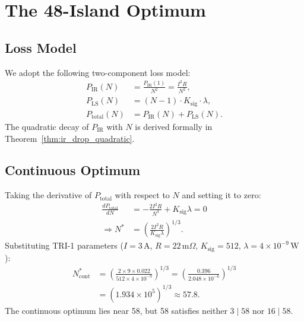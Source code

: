 \section{The 48-Island Optimum}
\label{sec:opt_48}

\subsection{Loss Model}

We adopt the following two-component loss model:
\begin{align}
  P_{\mathrm{IR}}(N) &= \frac{P_{\mathrm{IR}}(1)}{N^2}
    = \frac{I^2 R}{N^2},
    \label{eq:pir_n} \\
  P_{\mathrm{LS}}(N) &= (N-1) \cdot K_{\mathrm{sig}} \cdot \lambda,
    \label{eq:pls_n} \\
  P_{\mathrm{total}}(N) &= P_{\mathrm{IR}}(N) + P_{\mathrm{LS}}(N).
    \label{eq:ptotal_n}
\end{align}
The quadratic decay of $P_{\mathrm{IR}}$ with $N$ is derived formally in
Theorem~\ref{thm:ir_drop_quadratic}.

\subsection{Continuous Optimum}

Taking the derivative of $P_{\mathrm{total}}$ with respect to $N$ and setting
it to zero:
\begin{align}
  \frac{dP_{\mathrm{total}}}{dN}
  &= -\frac{2 I^2 R}{N^3} + K_{\mathrm{sig}} \lambda = 0 \\
  \Rightarrow N^* &= \left( \frac{2 I^2 R}{K_{\mathrm{sig}} \lambda} \right)^{1/3}.
  \label{eq:nstar_cont}
\end{align}
Substituting TRI-1 parameters ($I = 3\,\mathrm{A}$, $R = 22\,\mathrm{m}\Omega$,
$K_{\mathrm{sig}} = 512$, $\lambda = 4 \times 10^{-9}\,\mathrm{W}$):
\begin{align}
  N^*_{\mathrm{cont}}
  &= \left( \frac{2 \times 9 \times 0.022}{512 \times 4 \times 10^{-9}} \right)^{1/3}
   = \left( \frac{0.396}{2.048 \times 10^{-6}} \right)^{1/3} \\
  &= \left( 1.934 \times 10^5 \right)^{1/3}
   \approx 57.8.
\end{align}
The continuous optimum lies near 58, but 58 satisfies neither $3 \mid 58$
nor $16 \mid 58$.

